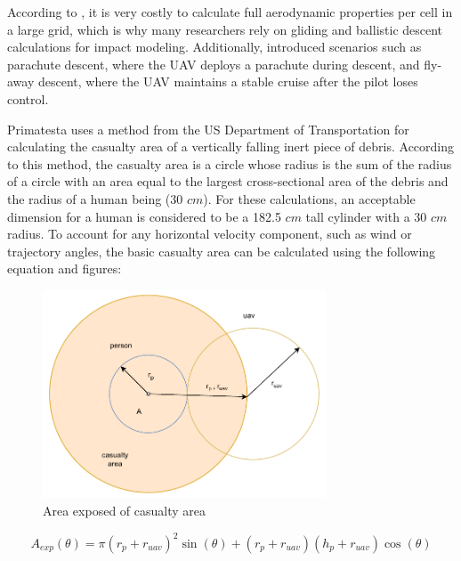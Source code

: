 \documentclass[12pt]{report}
\begin{document}
            According to \cite{primatesta_risk-based_2020}, it is very costly to calculate full aerodynamic properties
            per cell in a large grid, which is why many researchers rely on gliding and ballistic descent calculations
            for impact modeling. Additionally, \cite{primatesta_ground_2020} introduced scenarios such as parachute
            descent, where the UAV deploys a parachute during descent, and fly-away descent, where the UAV maintains a
            stable cruise after the pilot loses control.
                
            Primatesta uses a method from the US Department of Transportation \cite{faa_expected_2000} for calculating
            the casualty area of a vertically falling inert piece of debris. According to this method, the casualty area
            is a circle whose radius is the sum of the radius of a circle with an area equal to the largest
            cross-sectional area of the debris and the radius of a human being (30 \(cm\)). For these calculations, an
            acceptable dimension for a human is considered to be a 182.5 \(cm\) tall cylinder with a 30 \(cm\) radius.
            To account for any horizontal velocity component, such as wind or trajectory angles, the basic casualty area
            can be calculated using the following equation and figures:

            \begin{figure}[H]
                \centering
                \includegraphics[width=0.75\textwidth]{General Image/OSM Drone-Area Exposed.pdf}
                \caption{Area exposed of casualty area}
            \end{figure}

            \begin{equation}
                A_{exp}(\theta) = \pi (r_p + r_{uav})^2 \sin (\theta) + (r_p + r_{uav})(h_p + r_{uav}) \cos (\theta)
            \end{equation}
\end{document}
